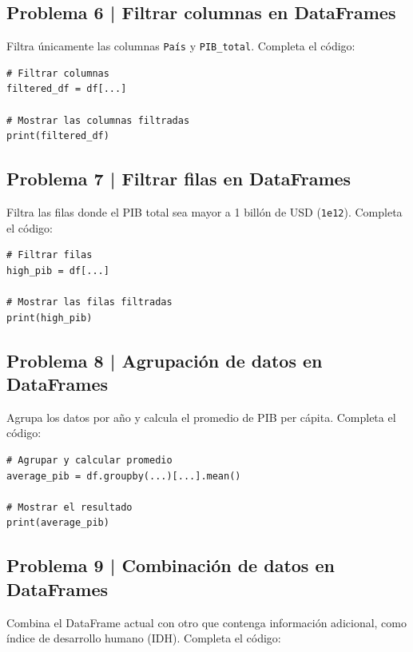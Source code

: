 \documentclass{article}
\begin{document}
\clearpage

\subsection*{Problema 6 | Filtrar columnas en DataFrames}

Filtra únicamente las columnas \texttt{País} y \texttt{PIB\_total}. Completa el código:

\begin{lstlisting}[style=python]
# Filtrar columnas
filtered_df = df[...]

# Mostrar las columnas filtradas
print(filtered_df)
\end{lstlisting}

\clearpage

\subsection*{Problema 7 | Filtrar filas en DataFrames}

Filtra las filas donde el PIB total sea mayor a 1 billón de USD (\texttt{1e12}). Completa el código:

\begin{lstlisting}[style=python]
# Filtrar filas
high_pib = df[...]

# Mostrar las filas filtradas
print(high_pib)
\end{lstlisting}

\clearpage

\subsection*{Problema 8 | Agrupación de datos en DataFrames}

Agrupa los datos por año y calcula el promedio de PIB per cápita. Completa el código:

\begin{lstlisting}[style=python]
# Agrupar y calcular promedio
average_pib = df.groupby(...)[...].mean()

# Mostrar el resultado
print(average_pib)
\end{lstlisting}

\clearpage

\subsection*{Problema 9 | Combinación de datos en DataFrames}

Combina el DataFrame actual con otro que contenga información adicional, como índice de desarrollo humano (IDH). Completa el código:
\end{document}
